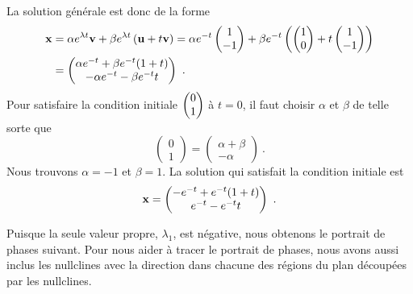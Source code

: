{La solution générale est donc de la forme
\begin{align*}
\mathbf{x} &= \alpha e^{\lambda t}\mathbf{v} 
+ \beta e^{\lambda t} \left(\mathbf{u} + t \mathbf{v}\right)
=  \alpha e^{-t} \begin{pmatrix} 1 \\ -1 \end{pmatrix}
+ \beta e^{-t}\left( \begin{pmatrix} 1 \\ 0 \end{pmatrix}
+t \begin{pmatrix} 1 \\ -1 \end{pmatrix} \right) \\
&= \begin{pmatrix}
\alpha e^{-t} + \beta e^{-t}(1+t) \\
- \alpha e^{-t} - \beta e^{-t}t
\end{pmatrix} \ .
\end{align*}
Pour satisfaire la condition initiale
$\displaystyle \begin{pmatrix} 0 \\ 1 \end{pmatrix}$ à $t=0$, il faut
choisir $\alpha$ et $\beta$ de telle sorte que
\[
\begin{pmatrix} 0 \\ 1 \end{pmatrix} = \begin{pmatrix}
\alpha + \beta \\ -\alpha \end{pmatrix} \ .
\]
Nous trouvons $\alpha = -1$ et $\beta = 1$.  La solution qui
satisfait la condition initiale est
\[
\mathbf{x} = \begin{pmatrix}
-e^{-t} + e^{-t}(1+t) \\
e^{-t} - e^{-t}t
\end{pmatrix}  \ .
\]

Puisque la seule valeur propre, $\lambda_1$, est négative, nous obtenons
le portrait de phases suivant.
Pour nous aider à tracer le portrait de phases, nous avons aussi
inclus les nullclines avec la direction dans chacune des régions
du plan découpées par les nullclines.
}


